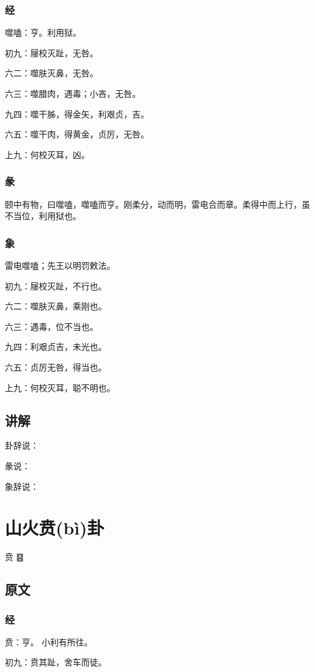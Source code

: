 \documentclass[12pt,oneside]{book}
\begin{document}
\subsection{经}
噬嗑：亨。利用狱。

初九：屦校灭趾，无咎。

六二：噬肤灭鼻，无咎。

六三：噬腊肉，遇毒；小吝，无咎。

九四：噬干胏，得金矢，利艰贞，吉。

六五：噬干肉，得黄金，贞厉，无咎。

上九：何校灭耳，凶。

\subsection{彖}
颐中有物，曰噬嗑，噬嗑而亨。刚柔分，动而明，雷电合而章。柔得中而上行，虽不当位，利用狱也。

\subsection{象}
雷电噬嗑；先王以明罚敕法。

初九：屦校灭趾，不行也。

六二：噬肤灭鼻，乘刚也。

六三：遇毒，位不当也。

九四：利艰贞吉，未光也。

六五：贞厉无咎，得当也。

上九：何校灭耳，聪不明也。

\section{讲解}
卦辞说：

彖说：

象辞说：

\chapter{山火贲(bì)卦}
贲 {\Large ䷕}

\section{原文}
\subsection{经}
贲：亨。 小利有所往。

初九：贲其趾，舍车而徒。
\end{document}
